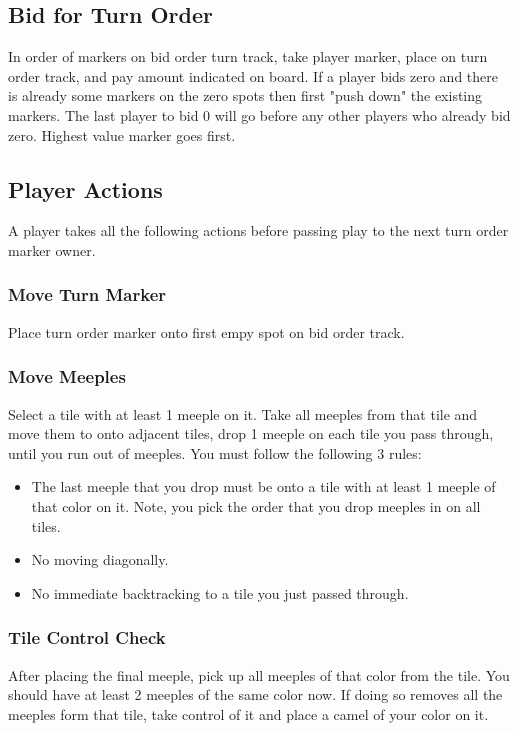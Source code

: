 \documentclass[12pt]{article}
\newenvironment{itemizeCustom}
{\begin{itemize}
  \setlength{\itemsep}{1pt}
  \setlength{\parskip}{0pt}
  \setlength{\parsep}{0pt}}
{\end{itemize}}
\begin{document}
\begin{multicols*}{2}
\subsection*{Bid for Turn Order}
In order of markers on bid order turn track, take player marker, place on turn order track, and pay amount indicated on board. If a player bids zero and there is already some markers on the zero spots then first "push down" the existing markers. The last player to bid 0 will go before any other players who already bid zero. Highest value marker goes first.

\subsection*{Player Actions}
A player takes all the following actions before passing play to the next turn order marker owner.

\subsubsection*{Move Turn Marker}
Place turn order marker onto first empy spot on bid order track.

\subsubsection*{Move Meeples}
Select a tile with at least 1 meeple on it. Take all meeples from that tile and move them to onto adjacent tiles, drop 1 meeple on each tile you pass through, until you run out of meeples. You must follow the following 3 rules:
\begin{itemizeCustom}
    \item The last meeple that you drop must be onto a tile with at least 1 meeple of that color on it. Note, you pick the order that you drop meeples in on all tiles.
    \item No moving diagonally.
    \item No immediate backtracking to a tile you just passed through.
\end{itemizeCustom}

\subsubsection*{Tile Control Check}
After placing the final meeple, pick up all meeples of that color from the tile. You should have at least 2 meeples of the same color now. If doing so removes all the meeples form that tile, take control of it and place a camel of your color on it.


\end{multicols*}
\end{document}
